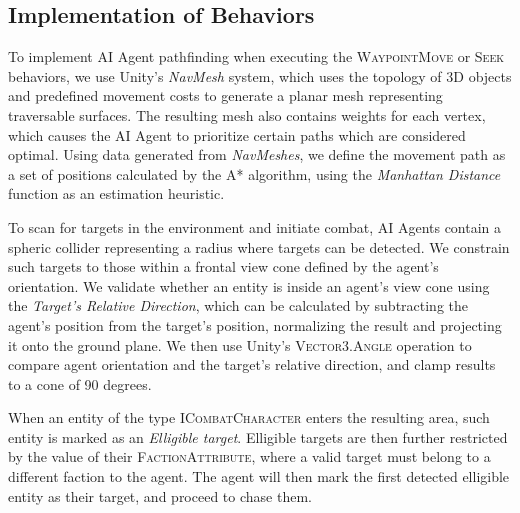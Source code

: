 


\subsection{Implementation of Behaviors}


To implement AI Agent pathfinding when executing the \textsc{WaypointMove} or \textsc{Seek} behaviors, we use Unity's \emph{NavMesh} system, which uses the topology of 3D objects and predefined movement costs to generate a planar mesh representing traversable surfaces. The resulting mesh also contains weights for each vertex, which causes the AI Agent to prioritize certain paths which are considered optimal. Using  data generated from \emph{NavMeshes}, we define the movement path as a set of positions calculated by the \textsc{A*} algorithm, using the \emph{Manhattan Distance} function as an estimation heuristic.

To scan for targets in the environment and initiate combat, AI Agents contain a spheric collider representing a radius where targets can be detected. We constrain such targets to those within a frontal view cone defined by the agent's orientation.  We validate whether an entity is inside an agent's view cone using the \emph{Target's Relative Direction}, which can be calculated by subtracting the agent's position from the target's position, normalizing the result and projecting it onto the ground plane. We then use Unity's \textsc{Vector3.Angle} operation to compare agent orientation and the target's relative direction, and clamp results to a cone of 90 degrees.

When an entity of the type \textsc{ICombatCharacter} enters the resulting area, such entity is marked as an \emph{Elligible target}. Elligible targets are then further restricted by the value of their \textsc{FactionAttribute}, where a valid target must belong to a different faction to the agent. The agent will then mark the first detected elligible entity as their target, and proceed to chase them.

